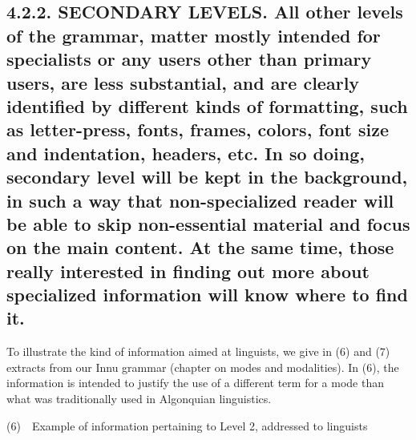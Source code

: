 \documentclass[letterpaper]{article}
\begin{document}
\subsection[4.2.2. SECONDARY LEVELS. All other levels of the grammar, matter mostly intended for specialists or any users other than primary users, are less substantial, and are clearly identified by different kinds of formatting, such as letter{}-press, fonts, frames, colors, \ font size and indentation, headers, etc. In so doing, secondary level will be kept in the background, in such a way that non{}-specialized reader will be able to skip non{}-essential material and focus on the main content. At the same time, those really interested in finding out more about specialized information will know where to find it.]{4.2.2. SECONDARY LEVELS. \textmd{All other levels of the grammar, matter mostly intended for specialists or any users }\textmd{other }\textmd{than primary users, }\textmd{are}\textmd{ less substantial, and }\textmd{are }\textmd{clearly }\textmd{identified }\textmd{by }\textmd{different kinds of}\textmd{ formatting}\textmd{, }\textmd{such as }\textmd{letter-press, fonts, }\textmd{frames}\textmd{, colors, }\textmd{ font size }\textmd{and indentation, headers, etc. In so doing, secondary level will be kept in the background, in such a way that non-specialized reader will be able to skip non-essential }\textmd{material }\textmd{and focus on }\textmd{the }\textmd{main content. }\textmd{At}\textmd{ the same time, those really interested }\textmd{in }\textmd{find}\textmd{ing}\textmd{ out}\textmd{ more }\textmd{about }\textmd{specialized information will know where to find it.}}
To illustrate the kind of information aimed at linguists, we give in (6) and (7) extracts from our Innu grammar (chapter on modes and modalities). In (6), the information is intended to justify the use of a different term for a mode than what was traditionally used in Algonquian linguistics.

 (6)\ \ Example of information pertaining to Level 2, addressed to linguists
\end{document}
